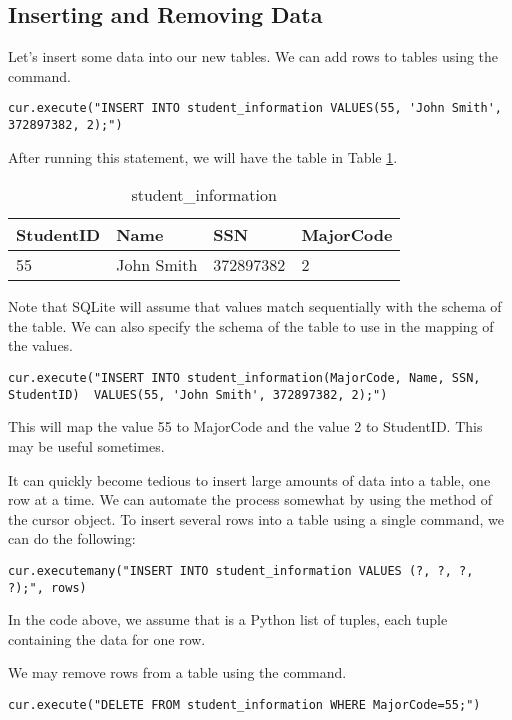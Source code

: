 \subsection*{Inserting and Removing Data}
Let's insert some data into our new tables.
We can add rows to tables using the  command.
\begin{lstlisting}
cur.execute("INSERT INTO student_information VALUES(55, 'John Smith', 372897382, 2);")
\end{lstlisting}
After running this statement, we will have the table in Table \ref{table:student_information1}.
\begin{table}
\begin{tabular}{|l|l|l|l|}
\hline
StudentID & Name & SSN & MajorCode \\
\hline
55 & John Smith & 372897382 & 2 \\
\hline
\end{tabular}
\caption{student\_information}
\label{table:student_information1}
\end{table}

Note that SQLite will assume that values match sequentially with the schema of the table.
We can also specify the schema of the table to use in the mapping of the values.
\begin{lstlisting}
cur.execute("INSERT INTO student_information(MajorCode, Name, SSN, StudentID)  VALUES(55, 'John Smith', 372897382, 2);")
\end{lstlisting}
This will map the value 55 to MajorCode and the value 2 to StudentID.  This may be useful sometimes.

It can quickly become tedious to insert large amounts of data into a table, one row at a time.
We can automate the process somewhat by using the  method of the cursor object.
To insert several rows into a table using a single command, we can do the following:
\begin{lstlisting}
cur.executemany("INSERT INTO student_information VALUES (?, ?, ?, ?);", rows)
\end{lstlisting}
In the code above, we assume that  is a Python list of tuples, each tuple containing the data for one
row.

We may remove rows from a table using the  command.
\begin{lstlisting}
cur.execute("DELETE FROM student_information WHERE MajorCode=55;")
\end{lstlisting}

